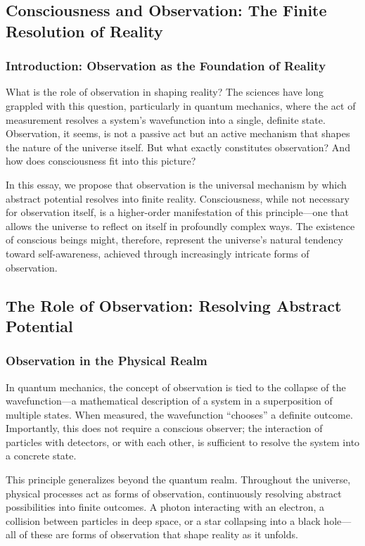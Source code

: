 \documentclass[12pt]{article}
\begin{document}
\subsection{Consciousness and Observation: The Finite Resolution of Reality}

\subsubsection{Introduction: Observation as the Foundation of Reality}

What is the role of observation in shaping reality? The sciences have long grappled with this question, particularly in quantum mechanics, where the act of measurement resolves a system's wavefunction into a single, definite state. Observation, it seems, is not a passive act but an active mechanism that shapes the nature of the universe itself. But what exactly constitutes observation? And how does consciousness fit into this picture?

In this essay, we propose that observation is the universal mechanism by which abstract potential resolves into finite reality. Consciousness, while not necessary for observation itself, is a higher-order manifestation of this principle—one that allows the universe to reflect on itself in profoundly complex ways. The existence of conscious beings might, therefore, represent the universe’s natural tendency toward self-awareness, achieved through increasingly intricate forms of observation.

\subsection{The Role of Observation: Resolving Abstract Potential}

\subsubsection{Observation in the Physical Realm}

In quantum mechanics, the concept of observation is tied to the collapse of the wavefunction—a mathematical description of a system in a superposition of multiple states. When measured, the wavefunction ``chooses'' a definite outcome. Importantly, this does not require a conscious observer; the interaction of particles with detectors, or with each other, is sufficient to resolve the system into a concrete state.

This principle generalizes beyond the quantum realm. Throughout the universe, physical processes act as forms of observation, continuously resolving abstract possibilities into finite outcomes. A photon interacting with an electron, a collision between particles in deep space, or a star collapsing into a black hole—all of these are forms of observation that shape reality as it unfolds.
\end{document}
